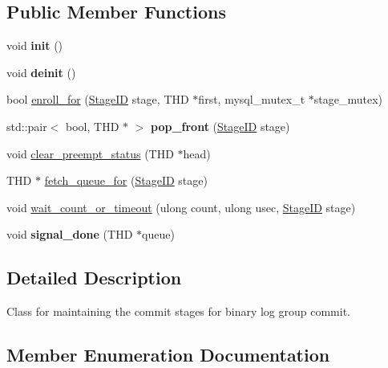 \subsection*{Public Member Functions}
\begin{DoxyCompactItemize}
\item 
\mbox{\label{classStage__manager_ab2945fd6e7fe996e58b4805628391e5c}} 
void {\bfseries init} ()
\item 
\mbox{\label{classStage__manager_ad3b92f020a94a4b01b62152394217ce6}} 
void {\bfseries deinit} ()
\item 
bool \mbox{\hyperlink{group__Binary__Log_ga71a83004e5774879856189f84d00094f}{enroll\+\_\+for}} (\mbox{\hyperlink{classStage__manager_a28879837525f3786d4bcb6f330f4ac69}{Stage\+ID}} stage, T\+HD $\ast$first, mysql\+\_\+mutex\+\_\+t $\ast$stage\+\_\+mutex)
\item 
\mbox{\label{classStage__manager_ac810a7d045dabc354a472221dad3f783}} 
std\+::pair$<$ bool, T\+HD $\ast$ $>$ {\bfseries pop\+\_\+front} (\mbox{\hyperlink{classStage__manager_a28879837525f3786d4bcb6f330f4ac69}{Stage\+ID}} stage)
\item 
void \mbox{\hyperlink{group__Binary__Log_gad3389586ace2de50ee7606d7acc98849}{clear\+\_\+preempt\+\_\+status}} (T\+HD $\ast$head)
\item 
T\+HD $\ast$ \mbox{\hyperlink{classStage__manager_aa5e8259651b127bec0dc58776abb2441}{fetch\+\_\+queue\+\_\+for}} (\mbox{\hyperlink{classStage__manager_a28879837525f3786d4bcb6f330f4ac69}{Stage\+ID}} stage)
\item 
void \mbox{\hyperlink{group__Binary__Log_gaa85432b55b5d1d84283e83c4399ad524}{wait\+\_\+count\+\_\+or\+\_\+timeout}} (ulong count, ulong usec, \mbox{\hyperlink{classStage__manager_a28879837525f3786d4bcb6f330f4ac69}{Stage\+ID}} stage)
\item 
void {\bfseries signal\+\_\+done} (T\+HD $\ast$queue)
\end{DoxyCompactItemize}


\subsection{Detailed Description}
Class for maintaining the commit stages for binary log group commit. 

\subsection{Member Enumeration Documentation}
\mbox{\label{classStage__manager_a28879837525f3786d4bcb6f330f4ac69}} 
